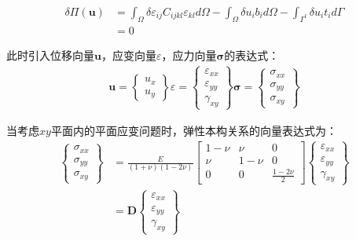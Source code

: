\begin{equation}\label{elasticity weak form}
\begin{split}
    \delta\Pi(\pmb{u})&=\int_{\Omega}\delta\varepsilon_{ij}C_{ijkl}\varepsilon_{kl}d\Omega-\int_{\Omega}\delta u_ib_id\Omega-\int_{\Gamma^t}\delta u_it_id\Gamma\\
   &=0
\end{split}
\end{equation}\par
此时引入位移向量$\pmb{u}$，应变向量$\varepsilon$，应力向量$\pmb{\sigma}$的表达式：
\begin{equation}
\begin{split}
    \pmb{u}=\left\{\begin{matrix} u_x\\u_y\end{matrix}\right\}
    \varepsilon=\left\{\begin{matrix}
        \varepsilon_{xx}\\\varepsilon_{yy}\\\gamma_{xy}
    \end{matrix}\right\}
    \pmb{\sigma}=\left\{\begin{matrix}
        \sigma_{xx}\\\sigma_{yy}\\\sigma_{xy}
    \end{matrix}\right\}
\end{split}
\end{equation}\par
当考虑$xy$平面内的平面应变问题时，弹性本构关系的向量表达式为：
\begin{equation}
\begin{split}
    \left\{\begin{matrix}
        \sigma_{xx}\\\sigma_{yy}\\\sigma_{xy}
    \end{matrix}\right\}&=\frac{E}{(1+\nu)(1-2\nu)}
    \left[\begin{matrix}
        1-\nu&\nu&0\\\nu&1-\nu&0\\0&0&\frac{1-2\nu}{2}
    \end{matrix}\right]
    \left\{\begin{matrix}
        \varepsilon_{xx}\\\varepsilon_{yy}\\\gamma_{xy}
    \end{matrix}\right\}\\
    &=\pmb{D}\left\{\begin{matrix}\varepsilon_{xx}\\\varepsilon_{yy}\\\gamma_{xy}\end{matrix}\right\}
\end{split}
\end{equation}\par

